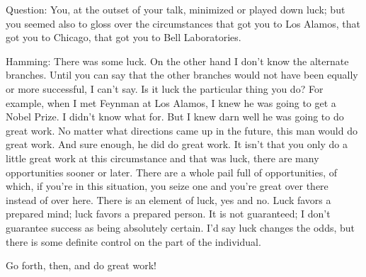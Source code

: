 \documentclass{article}
\begin{document}
Question: You, at the outset of your talk, minimized or played down luck; but you seemed also to gloss over the circumstances that got you to Los Alamos, that got you to Chicago, that got you to Bell Laboratories.

Hamming: There was some luck. On the other hand I don't know the alternate branches. Until you can say that the other branches would not have been equally or more successful, I can't say. Is it luck the particular thing you do? For example, when I met Feynman at Los Alamos, I knew he was going to get a Nobel Prize. I didn't know what for. But I knew darn well he was going to do great work. No matter what directions came up in the future, this man would do great work. And sure enough, he did do great work. It isn't that you only do a little great work at this circumstance and that was luck, there are many opportunities sooner or later. There are a whole pail full of opportunities, of which, if you're in this situation, you seize one and you're great over there instead of over here. There is an element of luck, yes and no. Luck favors a prepared mind; luck favors a prepared person. It is not guaranteed; I don't guarantee success as being absolutely certain. I'd say luck changes the odds, but there is some definite control on the part of the individual.

Go forth, then, and do great work!
\end{document}

